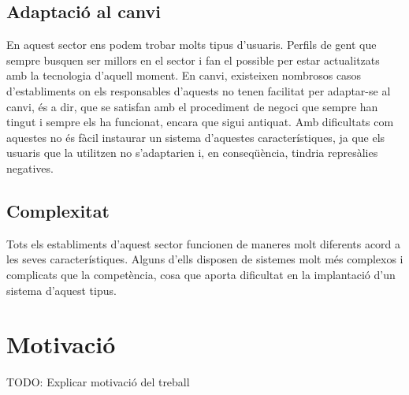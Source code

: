 \subsection{Adaptació al canvi}

En aquest sector ens podem trobar molts tipus d’usuaris. Perfils de gent que sempre busquen ser millors en el sector i fan el possible per estar actualitzats amb la tecnologia d’aquell moment. 
En canvi, existeixen nombrosos casos d’establiments on els responsables d’aquests no tenen facilitat per adaptar-se al canvi, és a dir, que se satisfan amb el procediment de negoci que sempre han tingut i sempre els ha funcionat, encara que sigui antiquat. Amb dificultats com aquestes no és fàcil instaurar un sistema d’aquestes característiques, ja que els usuaris que la utilitzen no s’adaptarien i, en conseqüència, tindria represàlies negatives.

\subsection{Complexitat}

Tots els establiments d’aquest sector funcionen de maneres molt diferents acord a les seves característiques. Alguns d’ells disposen de sistemes molt més complexos i complicats que la competència, cosa que aporta dificultat en la implantació d’un sistema d’aquest tipus.


\section{Motivació}

TODO: Explicar motivació del treball
